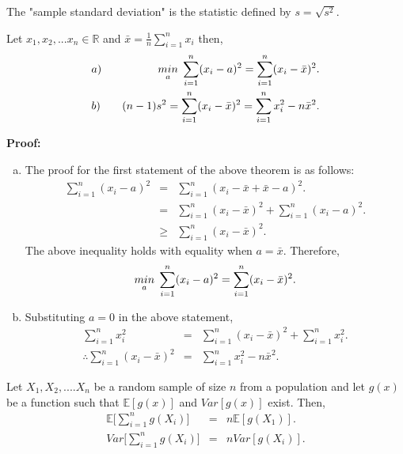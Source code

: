 \documentclass[a4paper,english,12pt]{article}
\begin{document}
\begin{defn}
The "sample standard deviation" is the statistic defined by $s = \sqrt{s^2}$.
\end{defn}

\begin{thm}
Let $x_1, x_2,...x_n  \in \mathbb{R}$ and $\bar{x} = \frac{1}{n} \displaystyle \sum_{i=1}^{n} x_i$ then,\\
\begin{eqnarray}
&a)& \hspace{0.3cm} \underset{a}{min} \hspace{0.1cm} \sum_{i=1}^{n} (x_i - a)^2 = \sum_{i=1}^{n} (x_i - \bar{x})^2. \\
&b)& \hspace{0.3cm} (n-1)s^2 = \sum_{i=1}^{n} (x_i - \bar{x})^2 = \sum_{i=1}^{n} x_i^2 - n\bar{x}^2.
\end{eqnarray}
\end{thm}

\textbf{Proof:}
\begin{enumerate}[a)]
\item{ 
The proof for the first statement of the above theorem is as follows:
\begin{eqnarray}
\sum_{i=1}^{n} (x_i - a)^2 &=& \sum_{i=1}^{n} (x_i - \bar{x} + \bar{x} - a)^2. \nonumber \\
&=& \sum_{i=1}^{n} (x_i - \bar{x})^2 + \sum_{i=1}^{n} (x_i - a)^2.  \\
&\geq& \sum_{i=1}^{n} (x_i - \bar{x})^2.
\end{eqnarray}
The above inequality holds with equality when $a = \bar{x}$. Therefore,
\begin{equation}
 \underset{a}{min} \hspace{0.1cm} \sum_{i=1}^{n} (x_i - a)^2 = \sum_{i=1}^{n} (x_i - \bar{x})^2.
\end{equation}
}
\item{
Substituting $a = 0$ in the above statement,
\begin{eqnarray}
\sum_{i=1}^{n} x_i^2 &=& \sum_{i=1}^{n} (x_i - \bar{x})^2 + \sum_{i=1}^{n} x_i^2.  \nonumber \\
\therefore \sum_{i=1}^{n} (x_i - \bar{x})^2 &=& \sum_{i=1}^{n} x_i^2 - n \bar{x}^2.
\end{eqnarray}
}
\end{enumerate}
\begin{lem}
Let $X_1, X_2, .... X_n$ be a random sample of size $n$ from a population and let $g(x)$ be a function such that $\mathbb{E}[g(x)]$ and $Var[g(x)]$ exist. Then,
\begin{eqnarray}
\mathbb{E}\Big[ \sum_{i=1}^{n} g(X_i) \Big] &=& n \mathbb{E}[g(X_1)].\\
Var \Big[ \sum_{i=1}^{n} g(X_i) \Big] &=& n Var[g(X_i)].
\end{eqnarray}
\end{lem}
\end{document}
